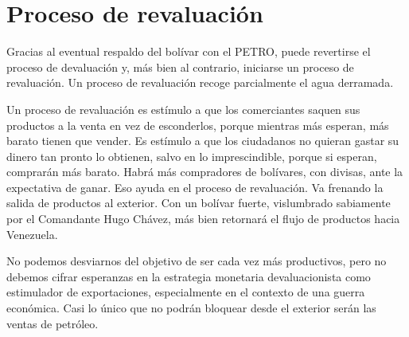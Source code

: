 %
\section{Proceso de revaluación}
\label{sec:annexb}
%
Gracias al eventual respaldo del bolívar con el PETRO, puede revertirse el proceso de devaluación y, más bien al contrario, iniciarse un proceso de revaluación. Un proceso de revaluación recoge parcialmente el agua derramada.

Un proceso de revaluación es estímulo a que los comerciantes saquen sus productos a la venta en vez de esconderlos, porque mientras más esperan, más barato tienen que vender. Es estímulo a que los ciudadanos no quieran gastar su dinero tan pronto lo obtienen, salvo en lo imprescindible, porque si esperan, comprarán más barato. Habrá más compradores de bolívares, con divisas, ante la expectativa de ganar. Eso ayuda en el proceso de revaluación. Va frenando la salida de productos al exterior. Con un bolívar fuerte, vislumbrado sabiamente por el Comandante Hugo Chávez, más bien retornará el flujo de productos hacia Venezuela. 

No podemos desviarnos del objetivo de ser cada vez más productivos, pero no debemos cifrar esperanzas en la estrategia monetaria devaluacionista como estimulador de exportaciones, especialmente en el contexto de una guerra económica. Casi lo único que no podrán bloquear desde el exterior serán las ventas de petróleo.